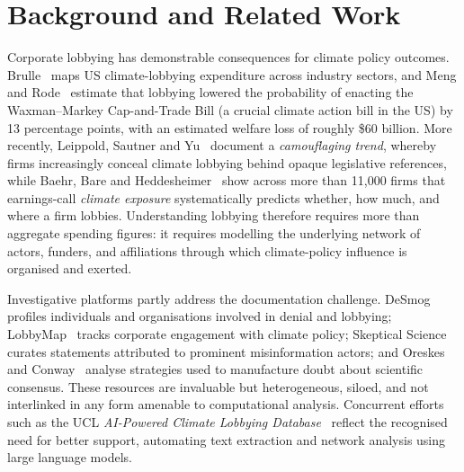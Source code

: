 \section{Background and Related Work}
\label{sec:related}

Corporate lobbying has demonstrable consequences for climate policy outcomes.
Brulle~\cite{brulle2018climate} maps US climate-lobbying expenditure across industry sectors, and Meng and Rode~\cite{meng2019social} estimate that lobbying lowered the probability of enacting the Waxman--Markey Cap-and-Trade Bill (a crucial climate action bill in the US) by 13 percentage points, with an estimated welfare loss of roughly \$60 billion.
More recently, Leippold, Sautner and Yu~\cite{leippold2024corporate} document a \emph{camouflaging trend}, whereby firms increasingly conceal climate lobbying behind opaque legislative references, while Baehr, Bare and Heddesheimer~\cite{baehr2026climate} show across more than 11{,}000 firms that earnings-call \emph{climate exposure} systematically predicts whether, how much, and where a firm lobbies.
Understanding lobbying therefore requires more than aggregate spending figures: it requires modelling the underlying network of actors, funders, and affiliations through which climate-policy influence is organised and exerted.

\begin{sloppypar}Investigative platforms partly address the documentation challenge.
DeSmog~\cite{desmog} profiles individuals and organisations involved in denial and lobbying; LobbyMap~\cite{lobbymap} tracks corporate engagement with climate policy; Skeptical Science~\cite{skepticalscience} curates statements attributed to prominent misinformation actors; and Oreskes and Conway~\cite{oreskes2011merchants} analyse strategies used to manufacture doubt about scientific consensus.
These resources are invaluable but heterogeneous, siloed, and not interlinked in any form amenable to computational analysis.
Concurrent efforts such as the UCL \emph{AI-Powered Climate Lobbying Database}~\cite{uclclimatelobbying} reflect the recognised need for better support, automating text extraction and network analysis using large language models.\end{sloppypar}

